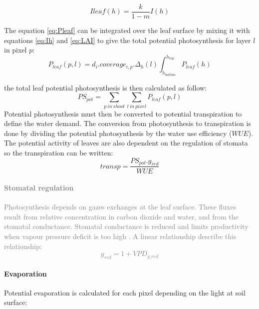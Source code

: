 \documentclass[a4paper,twoside, justified,marginals=raggedright, nobib]{tufte-handout}
\begin{document}
\begin{equation}
I{leaf}(h) = \frac{k}{1-m}I(h)
\end{equation}

The equation \eqref{eq:Pleaf} can be integrated over the leaf surface by mixing it with equations \eqref{eq:Ih} and \eqref{eq:LAI} to give the total potential photosynthesis for layer $l$ in pixel $p$:
\begin{equation}\label{Ppixlay}
P_{leaf}(p,l) = d_{i}.coverage_{i, p}.\Delta_{h}(l)\int_{h_{bottom}}^{h_{top}}P_{leaf}(h)
\end{equation}
%

the total leaf potential photosynthesis is then calculated as follow:
\begin{equation}\label{eq:PS_pot}
PS_{pot} = \sum_{p\ in\ shoot}\sum_{l\ in\ pixel}P_{leaf}(p,l)
\end{equation}
\indent Potential photosynthesis must then be converted to potential transpiration to define the water demand. The conversion from photosynthesis to transpiration is done by dividing the potential photosynthesis by the water use efficiency ($WUE$). The potential activity of leaves are also dependent on the regulation of stomata so the transpiration can be written:
\begin{equation}
transp = \frac{PS_{pot} . g_{red}}{WUE}
\end{equation}

\textcolor{Gray}{\paragraph{Stomatal regulation} Photosynthesis depends on gazes exchanges at the leaf surface. These fluxes result from relative concentration in carbon dioxide and water, and from the stomatal conductance. Stomatal conductance is reduced and limits productivity when vapour pressure deficit is too high . A linear relationship describe this relationship:
\begin{equation}
g_{red} = 1+ VPD_{g\_red}
\end{equation}}

\paragraph{Evaporation} Potential evaporation is calculated for each pixel depending on the light at soil surface:
\end{document}
